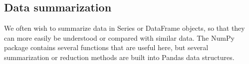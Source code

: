 \documentclass[11pt]{article} %
\begin{document}
\subsection{Data summarization}
We often wish to summarize data in Series or DataFrame objects, so that they can more easily be understood or compared with similar data. The NumPy package contains several functions that are useful here, but several summarization or reduction methods are built into Pandas data structures.
\end{document}

